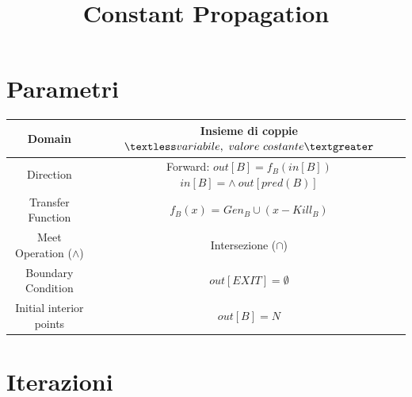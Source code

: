 \documentclass{article}
\title{\Huge{Constant Propagation}}
\date{}
\begin{document}
	
	\maketitle
	
	\section{Parametri}
	
	\begin{table}[h]
		\centering
		\Large
		\renewcommand{\arraystretch}{1.4}
		\begin{tabular}{|c|c|}
			\hline
			Domain &  \makecell{Insieme di coppie \\ $\textless variabile,\ valore\ costante\textgreater$} \\
			\hline
			Direction & \makecell[l]{Forward: \\ $out[B] = f_B(in[B])$ \\ $in[B] = \wedge\ out[pred(B)]$} \\
			\hline
			Transfer Function & $f_B(x)$ = $Gen_B \cup (x - Kill_B)$ \\
			\hline
			Meet Operation ($\wedge$) & Intersezione ($\cap$) \\
			\hline
			Boundary Condition & $out[EXIT] = \emptyset$ \\
			\hline
			Initial interior points & $out[B] = N$ \\
			\hline
		\end{tabular}
	\end{table}
	
	\vspace{1cm}
	
	\newpage
	
	\section{Iterazioni}
	
\end{document}
